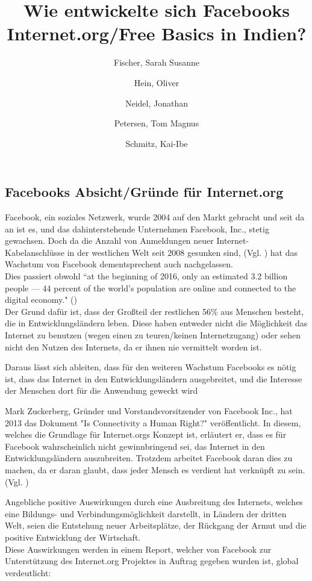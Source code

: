 \documentclass{article}
\title{Wie entwickelte sich Facebooks Internet.org/Free Basics in Indien?}
\author{
  Fischer, Sarah Susanne\\
  \and
  Hein, Oliver\\
  \and
  Neidel, Jonathan\\
  \and
  Petersen, Tom Magnus\\
  \and
  Schmitz, Kai-Ibe\\
}
\begin{document}
\subsection{Facebooks Absicht/Gründe für Internet.org}
Facebook, ein soziales Netzwerk, wurde 2004 auf den Markt gebracht und seit da an ist es, und das dahinterstehende Unternehmen Facebook, Inc., stetig gewachsen. 
Doch da die Anzahl von Anmeldungen neuer Internet-Kabelanschlüsse in der westlichen Welt seit 2008 gesunken sind,
(Vgl. \cite{ICTslowingDown}) hat das Wachstum von Facebook dementsprechent auch nachgelassen.\\
Dies passiert obwohl ``at the beginning of 2016, only an estimated 3.2 billion people — 44 percent of the world’s population are online and connected to the digital economy." (\cite{connectWorld})\\
Der Grund dafür ist, dass der Großteil der restlichen 56\% aus Menschen besteht, die in Entwicklungsländern leben. Diese haben entweder nicht die Möglichkeit das Internet zu benutzen (wegen einen zu teuren/keinen Internetzugang) oder sehen nicht den Nutzen des Internets, da er ihnen nie vermittelt worden ist.

\medskip

Daraus lässt sich ableiten, dass für den weiteren Wachstum Facebooks es nötig ist, dass das Internet in den Entwicklungsländern ausgebreitet, und die Interesse der Menschen dort für die Anwendung geweckt wird

\medskip
Mark Zuckerberg, Gründer und Vorstandsvorsitzender von Facebook Inc., hat 2013 das Dokument "Is Connectivity a Human Right?" veröffentlicht.
In diesem, welches die Grundlage für Internet.orgs Konzept ist, erläutert er, dass es für Facebook wahrscheinlich nicht gewinnbringend sei, das Internet in den Entwicklungsländern auszubreiten. Trotzdem arbeitet Facebook daran dies zu machen, da er daran glaubt, dass jeder Mensch es verdient hat verknüpft zu sein.(Vgl. \cite{HumanRight})

\medskip

Angebliche positive Auswirkungen durch eine Ausbreitung des Internets, welches eine Bildungs- und Verbindungsmöglichkeit darstellt, in Ländern der dritten Welt, seien die Entstehung neuer Arbeitsplätze, der Rückgang der Armut und die positive Entwicklung der Wirtschaft.\\
    
Diese Auswirkungen werden in einem Report, welcher von Facebook zur Unterstützung des Internet.org Projektes in Auftrag gegeben wurden ist, global verdeutlicht:
                    
\end{document}
